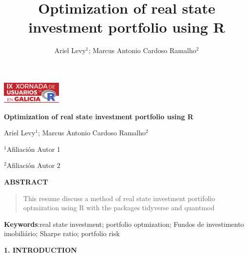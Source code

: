 \documentclass[
]{article}
\title{Optimization of real state investment portfolio using R}
\author{Ariel Levy\(^{1}\); Marcus Antonio Cardoso Ramalho\(^{2}\)}
\date{}
\begin{document}
\begin{flushright}
\includegraphics[angle=0,keepaspectratio,width=3cm]{logo.pdf}
\end{flushright}

 \vspace{20pt}

\begin{center}
\textbf{Optimization of real state investment portfolio using R}

\vspace{0.15cm}

Ariel Levy\(^{1}\); Marcus Antonio Cardoso Ramalho\(^{2}\) 
\end{center}

\vspace{0.06cm}

$^{1}$Afiliaci\'on Autor 1

$^{2}$Afiliaci\'on Autor 2

\begin{center}
\textbf{ABSTRACT}
\end{center}

\begin{quotation}
\noindent This resume discuss a method of real state investment
portifolio optmization using R with the packages tidyverse and quantmod
\end{quotation}

\vspace{0.4cm}

\textbf{Keywords}:real state investment; portfolio optmization; Fundos
de investimento imobiliário; Sharpe ratio; portfolio risk

\vspace{0.4cm}

\ifdefined\Shaded\renewenvironment{Shaded}{\begin{tcolorbox}[boxrule=0pt, sharp corners, enhanced, borderline west={3pt}{0pt}{shadecolor}, interior hidden, breakable, frame hidden]}{\end{tcolorbox}}\fi

\pagestyle{empty}
\setlength\parindent{0pt}

\begin{center}
\textbf{1. INTRODUCTION}
\end{center}
\end{document}
